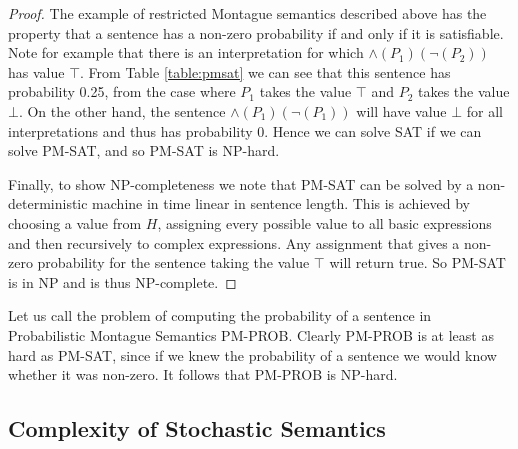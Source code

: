 \documentclass[manuscript]{clv2}
\begin{document}
\begin{proof}
The example of restricted Montague semantics described above has the
property that a sentence has a non-zero probability if and only if it
is satisfiable. Note for example that there is an interpretation for
which $\land (P_1)(\lnot (P_2))$ has value $\top$. From Table
\ref{table:pmsat} we can see that this sentence has probability 0.25,
from the case where $P_1$ takes the value $\top$ and $P_2$ takes the
value $\bot$. On the other hand, the sentence $\land (P_1)(\lnot
(P_1))$ will have value $\bot$ for all interpretations and thus has
probability 0. Hence we can solve SAT if we can solve PM-SAT, and so
PM-SAT is NP-hard.

Finally, to show NP-completeness we note that PM-SAT can be solved by
a non-deterministic machine in time linear in sentence length. This is
achieved by choosing a value from $H$, assigning every possible value
to all basic expressions and then recursively to complex
expressions. Any assignment that gives a non-zero probability for the
sentence taking the value $\top$ will return true. So PM-SAT is in NP
and is thus NP-complete.
\end{proof}

Let us call the problem of computing the probability of a sentence in
Probabilistic Montague Semantics PM-PROB. Clearly PM-PROB is at least
as hard as PM-SAT, since if we knew the probability of a sentence we
would know whether it was non-zero. It follows that PM-PROB is NP-hard.

\subsection{Complexity of Stochastic Semantics}
\end{document}
